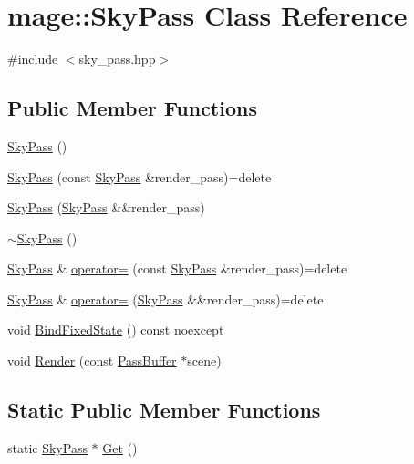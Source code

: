 \hypertarget{classmage_1_1_sky_pass}{}\section{mage\+:\+:Sky\+Pass Class Reference}
\label{classmage_1_1_sky_pass}


{\ttfamily \#include $<$sky\+\_\+pass.\+hpp$>$}

\subsection*{Public Member Functions}
\begin{DoxyCompactItemize}
\item 
\hyperlink{classmage_1_1_sky_pass_a41bb9d2d37f2c3a7bc5b12cffad9dafa}{Sky\+Pass} ()
\item 
\hyperlink{classmage_1_1_sky_pass_a78be688fecb0a4f55df78d4af01c4590}{Sky\+Pass} (const \hyperlink{classmage_1_1_sky_pass}{Sky\+Pass} \&render\+\_\+pass)=delete
\item 
\hyperlink{classmage_1_1_sky_pass_a6bd646c3f01beb171a19efe72b6cdbab}{Sky\+Pass} (\hyperlink{classmage_1_1_sky_pass}{Sky\+Pass} \&\&render\+\_\+pass)
\item 
\hyperlink{classmage_1_1_sky_pass_ab3e581e2eedfc62e13c71d91359f71ce}{$\sim$\+Sky\+Pass} ()
\item 
\hyperlink{classmage_1_1_sky_pass}{Sky\+Pass} \& \hyperlink{classmage_1_1_sky_pass_acfb9531772b437603825e43d17f4d983}{operator=} (const \hyperlink{classmage_1_1_sky_pass}{Sky\+Pass} \&render\+\_\+pass)=delete
\item 
\hyperlink{classmage_1_1_sky_pass}{Sky\+Pass} \& \hyperlink{classmage_1_1_sky_pass_ae15ed24b3bbf4008b90e4cfcb4117a84}{operator=} (\hyperlink{classmage_1_1_sky_pass}{Sky\+Pass} \&\&render\+\_\+pass)=delete
\item 
void \hyperlink{classmage_1_1_sky_pass_aa74c5e32a917aac610b2c7e4750c4639}{Bind\+Fixed\+State} () const noexcept
\item 
void \hyperlink{classmage_1_1_sky_pass_a5f7cd1d2e66bd5fbe9893bd42d3d6547}{Render} (const \hyperlink{structmage_1_1_pass_buffer}{Pass\+Buffer} $\ast$scene)
\end{DoxyCompactItemize}
\subsection*{Static Public Member Functions}
\begin{DoxyCompactItemize}
\item 
static \hyperlink{classmage_1_1_sky_pass}{Sky\+Pass} $\ast$ \hyperlink{classmage_1_1_sky_pass_af608935f6cb4b631512ee9c9eb6dec9d}{Get} ()
\end{DoxyCompactItemize}
